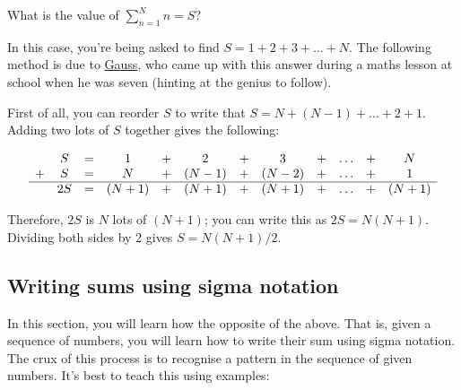 \documentclass[
  12pt,
  a4paper, oneside]{starmastarticle}
\begin{document}
\begin{tcolorbox}[enhanced jigsaw, left=2mm, colframe=quarto-callout-note-color-frame, toprule=.15mm, bottomrule=.15mm, opacityback=0, colback=white, arc=.35mm, leftrule=.75mm, breakable, rightrule=.15mm]
\begin{minipage}[t]{5.5mm}
\textcolor{quarto-callout-note-color}{\faInfo}
\end{minipage}%
\begin{minipage}[t]{\textwidth - 5.5mm}
What is the value of \(\displaystyle\sum_{n=1}^N n = S\)?

In this case, you're being asked to find \(S = 1 + 2 + 3 + \ldots + N\).
The following method is due to
\href{https://mathshistory.st-andrews.ac.uk/Biographies/Gauss/}{Gauss},
who came up with this answer during a maths lesson at school when he was
seven (hinting at the genius to follow).

First of all, you can reorder \(S\) to write that
\(S = N + (N-1) + \ldots + 2 + 1\). Adding two lots of \(S\) together
gives the following:

\[
\begin{array}{cccccccccccc}
& S & = & 1 & + & 2 & + & 3 & + & \ldots & + & N \\
+ & S & = & N & + & (N-1) & + & (N-2) & + & \ldots & + & 1\\\hline
& 2S & = & (N+1) & + & (N+1) & + & (N+1) & + & \ldots & + & (N+1)
\end{array}
\]

Therefore, \(2S\) is \(N\) lots of \((N+1)\); you can write this as
\(2S = N(N+1)\). Dividing both sides by \(2\) gives
\(S = N(N+1)/2\).\end{minipage}%
\end{tcolorbox}

\hypertarget{writing-sums-using-sigma-notation}{%
\subsection{Writing sums using sigma
notation}\label{writing-sums-using-sigma-notation}}

In this section, you will learn how the opposite of the above. That is,
given a sequence of numbers, you will learn how to write their sum using
sigma notation. The crux of this process is to recognise a pattern in
the sequence of given numbers. It's best to teach this using examples:
\end{document}
